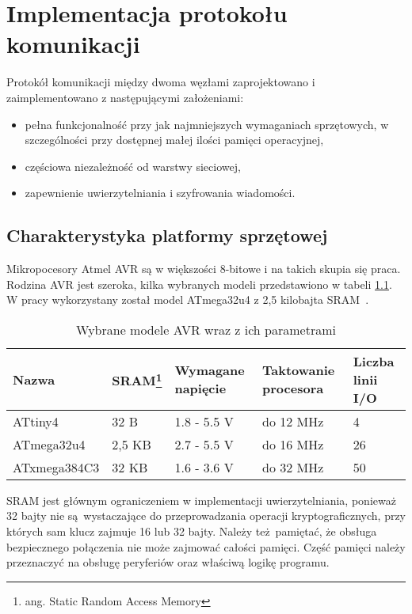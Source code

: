 \chapter{Implementacja protokołu komunikacji}
\label{cha:implementacja}

Protokół komunikacji między dwoma węzłami zaprojektowano i zaimplementowano z następującymi założeniami:

\begin{itemize}
\item pełna funkcjonalność przy jak najmniejszych wymaganiach sprzętowych, w szczególności przy dostępnej małej ilości pamięci operacyjnej,
\item częściowa niezależność od warstwy sieciowej,
\item zapewnienie uwierzytelniania i szyfrowania wiadomości.
\end{itemize}

\section{Charakterystyka platformy sprzętowej}
\label{cha:hardware}

Mikropocesory Atmel AVR są w większości 8-bitowe i na takich skupia się praca. Rodzina AVR jest szeroka, kilka wybranych modeli przedstawiono w tabeli \ref{tab:avrmodels}. W pracy wykorzystany został model ATmega32u4 z 2,5 kilobajta SRAM~\cite{Atmega32}.

\begin{table}[h]
\centering
\caption{Wybrane modele AVR wraz z ich parametrami}
\begin{tabular}{|l|l|l|l|l|}
    \hline
    \textbf{Nazwa}  &
    \textbf{SRAM\footnote{ang. Static Random Access Memory}}  &
    \textbf{Wymagane napięcie}  &
    \textbf{Taktowanie procesora}  &
    \textbf{Liczba linii I/O} \\
    \hline
    ATtiny4 \cite{Attiny4}& 32 B & 1.8 - 5.5 V & do 12 MHz & 4\\
    \hline
    ATmega32u4 \cite{Atmega32} & 2,5 KB & 2.7 - 5.5 V & do 16 MHz & 26\\
    \hline
    ATxmega384C3 \cite{Atxmega384} & 32 KB & 1.6 - 3.6 V & do 32 MHz & 50\\
    \hline
\end{tabular}
\label{tab:avrmodels}
\end{table}

SRAM jest głównym ograniczeniem w implementacji uwierzytelniania, ponieważ 32 bajty nie są wystaczające do przeprowadzania operacji kryptograficznych, przy których sam klucz zajmuje 16 lub 32 bajty. Należy też pamiętać, że obsługa bezpiecznego połączenia nie może zajmować całości pamięci. Część pamięci należy przeznaczyć na obsługę peryferiów oraz właściwą logikę programu.

